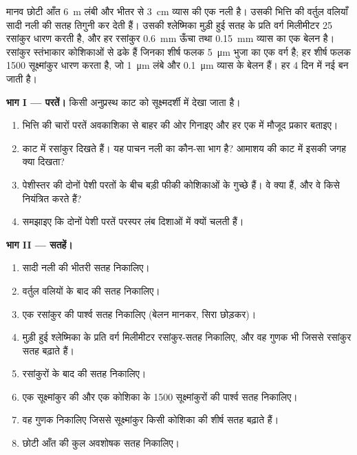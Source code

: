 \begin{problem}
\label{pb:b1:body-plans-tissues:1}
मानव छोटी आँत \qty{6}{m} लंबी और भीतर से \qty{3}{cm} व्यास की एक नली
है। उसकी भित्ति की वर्तुल वलियाँ सादी नली की सतह तिगुनी कर देती हैं।
उसकी श्लेष्मिका मुड़ी हुई सतह के प्रति वर्ग मिलीमीटर \qty{25}{} रसांकुर
धारण करती है, और हर रसांकुर \qty{0.6}{mm} ऊँचा तथा \qty{0.15}{mm} व्यास
का एक बेलन है। रसांकुर स्तंभाकार कोशिकाओं से ढके हैं जिनका शीर्ष फलक
\qty{5}{\micro m} भुजा का एक वर्ग है; हर शीर्ष फलक \qty{1500}{}
सूक्ष्मांकुर धारण करता है, जो \qty{1}{\micro m} लंबे और
\qty{0.1}{\micro m} व्यास के बेलन हैं।  हर \qty{4}{} दिन में नई बन
जाती है।

\medskip
\noindent\textbf{भाग I --- परतें।}
किसी अनुप्रस्थ काट को सूक्ष्मदर्शी में देखा जाता है।
\begin{enumerate}
  \item भित्ति की चारों परतें अवकाशिका से बाहर की ओर गिनाइए और हर एक
        में मौजूद  प्रकार बताइए।
  \item काट में रसांकुर दिखते हैं। यह पाचन नली का कौन-सा भाग है?
        आमाशय की काट में इसकी जगह क्या दिखता?
  \item पेशीस्तर की दोनों पेशी परतों के बीच बड़ी फीकी कोशिकाओं के
        गुच्छे हैं। वे क्या हैं, और वे किसे नियंत्रित करते हैं?
  \item समझाइए कि दोनों पेशी परतें परस्पर लंब दिशाओं में क्यों चलती
        हैं।
\end{enumerate}

\medskip
\noindent\textbf{भाग II --- सतहें।}
\begin{enumerate}[resume]
  \item सादी नली की भीतरी सतह निकालिए।
  \item वर्तुल वलियों के बाद की सतह निकालिए।
  \item एक रसांकुर की पार्श्व सतह निकालिए (बेलन मानकर, सिरा छोड़कर)।
  \item मुड़ी हुई श्लेष्मिका के प्रति वर्ग मिलीमीटर रसांकुर-सतह
        निकालिए, और वह गुणक भी जिससे रसांकुर सतह बढ़ाते हैं।
  \item रसांकुरों के बाद की सतह निकालिए।
  \item एक सूक्ष्मांकुर की और एक कोशिका के \qty{1500}{} सूक्ष्मांकुरों
        की पार्श्व सतह निकालिए।
  \item वह गुणक निकालिए जिससे सूक्ष्मांकुर किसी कोशिका की शीर्ष सतह
        बढ़ाते हैं।
  \item छोटी आँत की कुल अवशोषक सतह निकालिए।
\end{enumerate}


\end{problem}
